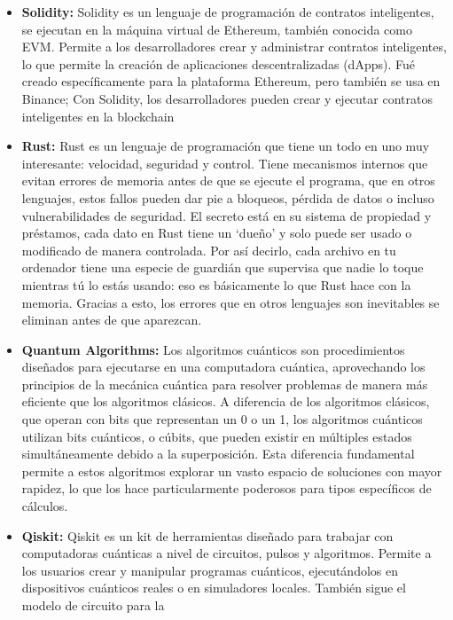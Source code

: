 \documentclass[oneside,11pt]{Latex/Classes/PhDthesisPSnPDF}
\begin{document}
\begin{itemize}
  proporcionar servicios financieros y aplicaciones digitales a
  cualquier persona, en cualquier lugar.
\item
  \textbf{Solidity:} Solidity es un lenguaje de programación de
  contratos inteligentes, se ejecutan en la máquina virtual de Ethereum,
  también conocida como EVM. Permite a los desarrolladores crear y
  administrar contratos inteligentes, lo que permite la creación de
  aplicaciones descentralizadas (dApps). Fué creado específicamente para
  la plataforma Ethereum, pero también se usa en Binance; Con Solidity,
  los desarrolladores pueden crear y ejecutar contratos inteligentes en
  la blockchain
\item
  \textbf{Rust:} Rust es un lenguaje de programación que tiene un todo
  en uno muy interesante: velocidad, seguridad y control. Tiene
  mecanismos internos que evitan errores de memoria antes de que se
  ejecute el programa, que en otros lenguajes, estos fallos pueden dar
  pie a bloqueos, pérdida de datos o incluso vulnerabilidades de
  seguridad. El secreto está en su sistema de propiedad y préstamos,
  cada dato en Rust tiene un `dueño' y solo puede ser usado o modificado
  de manera controlada. Por así decirlo, cada archivo en tu ordenador
  tiene una especie de guardián que supervisa que nadie lo toque
  mientras tú lo estás usando: eso es básicamente lo que Rust hace con
  la memoria. Gracias a esto, los errores que en otros lenguajes son
  inevitables se eliminan antes de que aparezcan.
\item
  \textbf{Quantum Algorithms:} Los algoritmos cuánticos son
  procedimientos diseñados para ejecutarse en una computadora cuántica,
  aprovechando los principios de la mecánica cuántica para resolver
  problemas de manera más eficiente que los algoritmos clásicos. A
  diferencia de los algoritmos clásicos, que operan con bits que
  representan un 0 o un 1, los algoritmos cuánticos utilizan bits
  cuánticos, o cúbits, que pueden existir en múltiples estados
  simultáneamente debido a la superposición. Esta diferencia fundamental
  permite a estos algoritmos explorar un vasto espacio de soluciones con
  mayor rapidez, lo que los hace particularmente poderosos para tipos
  específicos de cálculos.
\item
  \textbf{Qiskit:} Qiskit es un kit de herramientas diseñado para
  trabajar con computadoras cuánticas a nivel de circuitos, pulsos y
  algoritmos. Permite a los usuarios crear y manipular programas
  cuánticos, ejecutándolos en dispositivos cuánticos reales o en
  simuladores locales. También sigue el modelo de circuito para la

\end{itemize}
\end{document}
